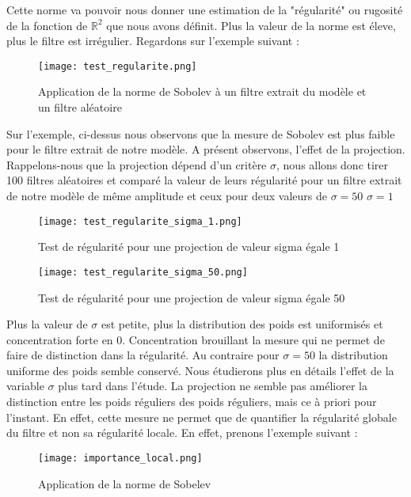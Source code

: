 \documentclass[12pt,a4paper]{article}
\begin{document}
Cette norme va pouvoir nous donner une estimation de la "régularité" ou rugosité de la fonction de $\mathbb{R}^2$ que nous avons définit. 
Plus la valeur de la norme est éleve, plus le filtre est irrégulier. 
Regardons sur l'exemple suivant : 
\begin{figure}[H]
\centering
\texttt{[image: test\_regularite.png]} %
    \caption{Application de la norme de Sobolev à un filtre extrait du modèle et un filtre aléatoire} %
    \label{fig:mon_image} %
\end{figure}
Sur l'exemple, ci-dessus nous observons que la mesure de Sobolev est plus faible pour le filtre extrait de notre modèle. 
A présent observons, l'effet de la projection. Rappelons-nous que la projection dépend d'un critère $\sigma$, nous allons donc tirer 100 filtres aléatoires et comparé la valeur de leurs régularité pour un filtre extrait de notre modèle de même amplitude et ceux pour deux valeurs de $\sigma = 50$ $\sigma = 1$
\begin{figure}[H] %
    \centering    %
    \texttt{[image: test\_regularite\_sigma\_1.png]} %
    \caption{Test de régularité pour une projection de valeur sigma égale 1} %
    \label{fig:mon_image} %
\end{figure}
\begin{figure}[H] %
    \centering    %
    \texttt{[image: test\_regularite\_sigma\_50.png]} %
    \caption{Test de régularité pour une projection de valeur sigma égale 50} %
    \label{fig:mon_image} %
\end{figure}
Plus la valeur de $\sigma$ est petite, plus la distribution des poids est uniformisés et concentration forte en 0. Concentration brouillant la mesure qui ne permet de faire de distinction dans la régularité. 
Au contraire pour $\sigma = 50 $ la distribution uniforme des poids semble conservé. Nous étudierons plus en détails l'effet de la variable $\sigma$ plus tard dans l'étude. 
La projection ne semble pas améliorer la distinction entre les poids réguliers des poids réguliers, mais ce à priori pour l'instant. En effet, cette mesure ne permet que de quantifier la régularité globale du filtre et non sa régularité locale. En effet, prenons l'exemple suivant : 
\begin{figure}[H] %
    \centering    %
    \texttt{[image: importance\_local.png]} %
    \caption{Application de la norme de Sobelev} %
    \label{fig:mon_image} %
\end{figure}
\end{document}

